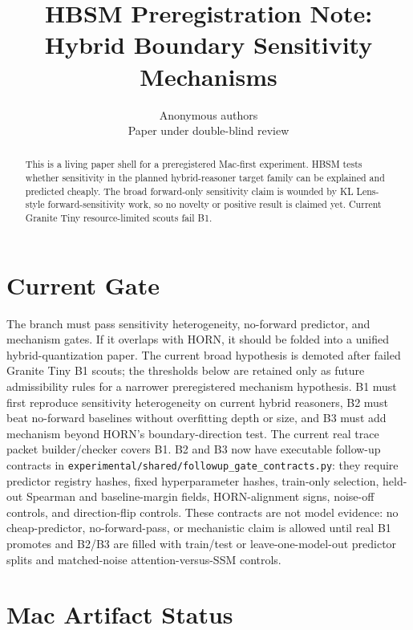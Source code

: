 \documentclass{article}
\title{HBSM Preregistration Note: Hybrid Boundary Sensitivity Mechanisms}
\author{Anonymous authors\\Paper under double-blind review}
\begin{document}
\maketitle

\begin{abstract}
This is a living paper shell for a preregistered Mac-first experiment. HBSM
tests whether sensitivity in the planned hybrid-reasoner target family can be
explained and predicted cheaply. The broad forward-only sensitivity claim is wounded by
KL Lens-style forward-sensitivity work, so no novelty or positive result is
claimed yet. Current Granite Tiny resource-limited scouts fail B1.
\end{abstract}

\section{Current Gate}

The branch must pass sensitivity heterogeneity, no-forward predictor, and
mechanism gates. If it overlaps with HORN, it should be folded into a unified
hybrid-quantization paper.
The current broad hypothesis is demoted after failed Granite Tiny B1 scouts;
the thresholds below are retained only as future admissibility rules for a
narrower preregistered mechanism hypothesis.
B1 must first reproduce sensitivity heterogeneity on current hybrid reasoners,
B2 must beat no-forward baselines without overfitting depth or size, and B3
must add mechanism beyond HORN's boundary-direction test.
The current real trace packet builder/checker covers B1. B2 and B3 now have
executable follow-up contracts in \texttt{experimental/shared/followup\_gate\_contracts.py}:
they require predictor registry hashes, fixed hyperparameter hashes, train-only
selection, held-out Spearman and baseline-margin fields, HORN-alignment signs,
noise-off controls, and direction-flip controls. These contracts are not model
evidence: no cheap-predictor, no-forward-pass, or mechanistic claim is allowed
until real B1 promotes and B2/B3 are filled with train/test or
leave-one-model-out predictor splits and matched-noise attention-versus-SSM
controls.

\section{Mac Artifact Status}
\end{document}
